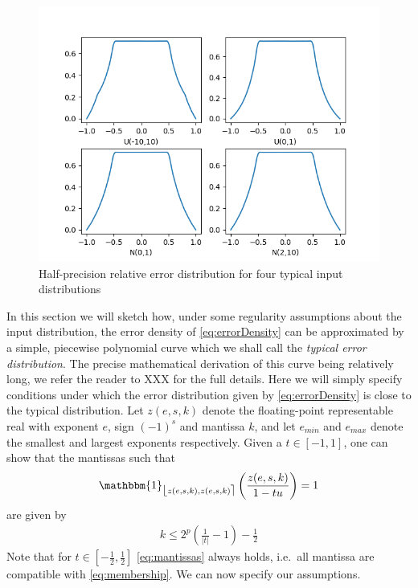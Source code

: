 \documentclass[10pt,conference]{IEEEtran}
\newcommand{\ie}{i.e.\ }
\newcommand{\fintvl}[1][x]{\mathlarger{\lfloor}#1,#1\mathlarger{\rceil}}
\newcommand{\one}{\mathbbm{1}}
\newcommand{\absv}[1]{\vert #1\vert}
\begin{document}
\vspace{-1em}
\begin{figure}[h!]
\hspace{-3em}
\includegraphics[scale=0.65]{pics/several_examples}
\caption{Half-precision relative error distribution for four typical input distributions}
\label{fig:errdist}
\end{figure}

In this section we will sketch how, under some regularity assumptions about the input distribution, the error density of \cref{eq:errorDensity} can be approximated by a simple, piecewise polynomial curve which we shall call the \emph{typical error distribution}. The precise mathematical derivation of this curve being relatively long, we refer the reader to XXX for the full details. Here we will simply specify conditions under which the error distribution given by \cref{eq:errorDensity} is close to the typical distribution. Let $z(e,s,k)$ denote the floating-point representable real with exponent $e$, sign $(-1)^s$ and mantissa $k$, and let $e_{min}$ and $e_{max}$ denote the smallest and largest exponents respectively. Given a $t\in \left[-1,1\right]$, one can show that the mantissas such that
\begin{align}
\one_{\fintvl[z(e,s,k)]}\left(\frac{z(e,s,k)}{1-tu}\right)=1\label{eq:membership}
\end{align}
are given by 
\begin{align}
k\leq 2^p\left(\frac{1}{\absv{t}}-1\right)-\frac{1}{2}\label{eq:mantissas}
\end{align}
Note that for $t\in \left[-\frac{1}{2},\frac{1}{2}\right]$ \cref{eq:mantissas} always holds, \ie all mantissa are compatible with \cref{eq:membership}.
We can now specify our assumptions.
\end{document}
